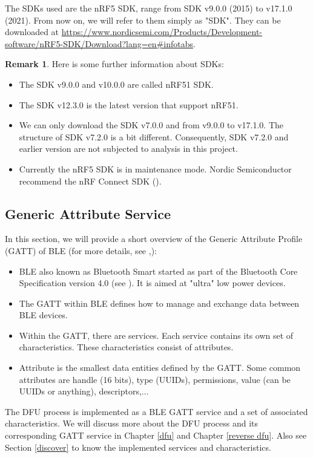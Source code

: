 \documentclass{article}
\theoremstyle{plain}
\theoremstyle{definition}
\newtheorem{remark}{Remark}
\numberwithin{equation}{section}
\begin{document}
The SDKs used are the nRF5 SDK, range from SDK v9.0.0 (2015) to v17.1.0 (2021). From now on, we will refer to them simply as "SDK". They can be downloaded at \url{https://www.nordicsemi.com/Products/Development-software/nRF5-SDK/Download?lang=en#infotabs}.

\begin{remark}
	Here is some further information about SDKs:
	\begin{itemize}
		\item The SDK v9.0.0 and v10.0.0 are called nRF51 SDK.
		\item The SDK v12.3.0 is the latest version that support nRF51.
		\item We can only download the SDK v7.0.0 and from v9.0.0 to v17.1.0. The structure of SDK v7.2.0 is a bit different. Consequently, SDK v7.2.0 and earlier version are not subjected to analysis in this project.
		\item Currently the nRF5 SDK is in maintenance mode. Nordic Semiconductor recommend the nRF Connect SDK (\cite{nrf-connect-sdk}).
	\end{itemize}
\end{remark}


\subsection{Generic Attribute Service} \label{gatt}
In this section, we will provide a short overview of the Generic Attribute Profile (GATT) of BLE (for more details, see \cite[chapter 4]{ble1},\cite[chapter 13]{ble2}):
\begin{itemize}
	\item BLE also known as Bluetooth Smart started as part of the Bluetooth Core Specification version 4.0 (see \cite{core}). It is aimed at "ultra" low power devices.
	\item The GATT within BLE defines how to manage and exchange data between BLE devices.
	\item Within the GATT, there are services. Each service contains its own set of characteristics. These characteristics consist of attributes.
	\item Attribute is the smallest data entities defined by the GATT. Some common attributes are handle (16 bits), type (UUIDs), permissions, value (can be UUIDs or anything), descriptors,$\ldots$
\end{itemize}
The DFU process is implemented as a BLE GATT service and a set of associated characteristics. We will discuss more about the DFU process and its corresponding GATT service in Chapter \ref{dfu} and Chapter \ref{reverse dfu}. Also see Section \ref{discover} to know the  implemented services and characteristics.
\end{document}
